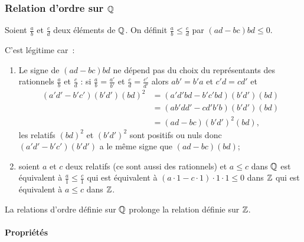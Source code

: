 \subsubsection{Relation d'ordre sur $\mathbb{Q}$}

\begin{defdef}
  Soient $\frac{a}{b}$ et $\frac{c}{d}$ deux éléments de $\mathbb{Q}$. On définit $\frac{a}{b} \leqslant \frac{c}{d}$ par $(ad-bc)bd \leqslant 0$.
\end{defdef}

C'est légitime car~:
\begin{enumerate}
\item Le signe de $(ad-bc)bd$ ne dépend pas du choix du représentants des rationnels $\frac{a}{b}$ et $\frac{c}{d}$ : si $\frac{a}{b}=\frac{a'}{b'}$ et $\frac{c}{d} = \frac{c'}{d'}$ alors $ab'=b'a$ et $c'd=cd'$ et
  \begin{align}
    (a'd'-b'c')(b'd')(bd)^2&=(a'd'bd -b'c'bd)(b'd')(bd)\\
    &=(ab'dd'-cd'b'b)(b'd')(bd)\\
    &=(ad-bc)(b'd')^2(bd),
  \end{align}
  les relatifs $(bd)^2$ et $(b'd')^2$ sont positifs ou nuls donc $(a'd'-b'c')(b'd')$ a le même signe que $(ad-bc)(bd)$;
\item soient $a$ et $c$ deux relatifs (ce sont aussi des rationnels) et $a \leqslant c$ dans $\mathbb{Q}$ est équivalent à $\frac{a}{1} \leqslant \frac{c}{1}$ qui est équivalent à $(a\cdot 1-c \cdot 1)\cdot 1 \cdot 1 \leqslant 0$ dans $\mathbb{Z}$ qui est équivalent à $a \leqslant c$ dans $\mathbb{Z}$.
\end{enumerate}

La relations d'ordre définie sur $\mathbb{Q}$ prolonge la relation définie sur $\mathbb{Z}$.

\paragraph{Propriétés}

